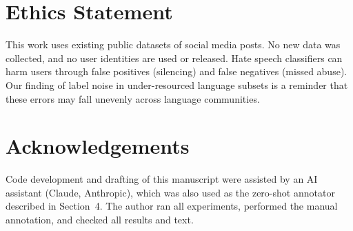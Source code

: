 \documentclass[11pt,a4paper]{article}
\begin{document}
\section*{Ethics Statement}
This work uses existing public datasets of social media posts. No new data was collected, and no user identities are used or released. Hate speech classifiers can harm users through false positives (silencing) and false negatives (missed abuse). Our finding of label noise in under-resourced language subsets is a reminder that these errors may fall unevenly across language communities.

\section*{Acknowledgements}
Code development and drafting of this manuscript were assisted by an AI assistant (Claude, Anthropic), which was also used as the zero-shot annotator described in Section~4. The author ran all experiments, performed the manual annotation, and checked all results and text.
\end{document}
